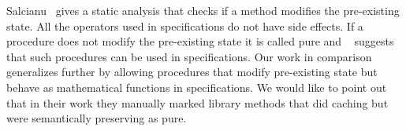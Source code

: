Salcianu~\cite{sualcianu2005purity} gives a static analysis that
checks if a method modifies the pre-existing state. All the operators
used in specifications do not have side effects. If a procedure does
not modify the pre-existing state it is called pure and
~\cite{barnett200499} suggests that such procedures can be used in
specifications. Our work in comparison generalizes further by allowing
procedures that modify pre-existing state but behave as mathematical
functions in specifications. We would like to point out that in their
work they manually marked library methods that did caching but were
semantically preserving as pure.

\nocite{barnett2004spec}
\nocite{lahiri2013differential}
\nocite{de2008z3}
\nocite{alpern1988detecting}
\nocite{sondergaard1990referential}
\nocite{flanagan2001avoiding}
\nocite{sualcianu2005purity}
\nocite{cytron1991efficiently}
\nocite{leino2008boogie}